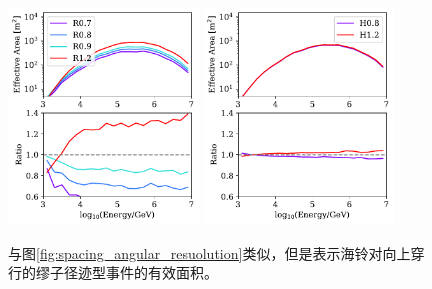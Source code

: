 \begin{figure}[!htb]%
    \centering
    \includegraphics[width=0.45\textwidth]{img/spacing/effective_area_up-going_hori.pdf}
    \includegraphics[width=0.45\textwidth]{img/spacing/effective_area_up-going_vert.pdf}
    \caption{与图\ref{fig:spacing_angular_resuolution}类似，但是表示海铃对向上穿行的缪子径迹型事件的有效面积。}
    \label{fig:spacing_effective_area_up-going}
\end{figure}
